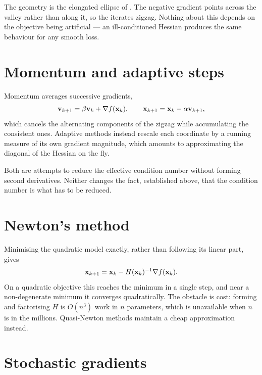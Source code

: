 
\begin{remark}
The geometry is the elongated ellipse of . The negative
gradient points across the valley rather than along it, so the iterates zigzag.
Nothing about this depends on the objective being artificial --- an
ill-conditioned Hessian produces the same behaviour for any smooth loss.
\end{remark}

\section{Momentum and adaptive steps}

Momentum averages successive gradients,
\[
	\mathbf{v}_{k+1}=\beta\mathbf{v}_k+\nabla f(\mathbf{x}_k),
	\qquad
	\mathbf{x}_{k+1}=\mathbf{x}_k-\alpha\mathbf{v}_{k+1},
\]
which cancels the alternating components of the zigzag while accumulating the
consistent ones. Adaptive methods instead rescale each coordinate by a running
measure of its own gradient magnitude, which amounts to approximating the
diagonal of the Hessian on the fly.

\begin{remark}
Both are attempts to reduce the effective condition number without forming
second derivatives. Neither changes the fact, established above, that the
condition number is what has to be reduced.
\end{remark}

\section{Newton's method}

Minimising the quadratic model  exactly, rather than following its
linear part, gives
\[
	\mathbf{x}_{k+1}=\mathbf{x}_k-H(\mathbf{x}_k)^{-1}\nabla f(\mathbf{x}_k).
\]
On a quadratic objective this reaches the minimum in a single step, and near a
non-degenerate minimum it converges quadratically. The obstacle is cost: forming
and factorising \(H\) is \(O(n^{3})\) work in \(n\) parameters, which is
unavailable when \(n\) is in the millions. Quasi-Newton methods maintain a
cheap approximation instead.

\section{Stochastic gradients}

